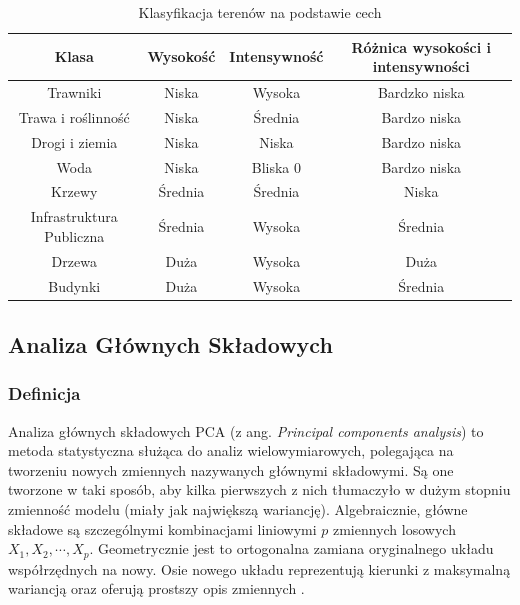 \begin{table}[h!]
    \centering
    \caption{Klasyfikacja terenów na podstawie cech}
    \label{tab:przypisanie_do_klas}
    \begin{tabular}{|c|c|c|c|}
        \hline
        Klasa & Wysokość & Intensywność & Różnica wysokości i intensywności\\
        \hline
        Trawniki & Niska & Wysoka & Bardzko niska\\
        \hline
        Trawa i roślinność & Niska & Średnia & Bardzo niska\\
        \hline
        Drogi i ziemia & Niska & Niska & Bardzo niska\\
        \hline
        Woda & Niska & Bliska 0 & Bardzo niska\\
        \hline
        Krzewy & Średnia & Średnia & Niska\\
        \hline
        Infrastruktura Publiczna & Średnia & Wysoka & Średnia\\
        \hline
        Drzewa & Duża & Wysoka & Duża\\
        \hline
        Budynki & Duża & Wysoka & Średnia\\
        \hline
    \end{tabular}
\end{table}

\subsection{Analiza Głównych Składowych}

\subsubsection{Definicja}
Analiza głównych składowych PCA (z ang. \textit{Principal components analysis}) to metoda statystyczna służąca do analiz wielowymiarowych, polegająca na tworzeniu nowych zmiennych nazywanych głównymi składowymi.
Są one tworzone w taki sposób, aby kilka pierwszych z nich tłumaczyło w dużym stopniu zmienność modelu (miały jak największą wariancję). Algebraicznie, główne składowe są szczególnymi kombinacjami liniowymi $p$
zmiennych losowych $X_{1}, X_{2}, \cdots, X_{p}$. Geometrycznie jest to ortogonalna zamiana oryginalnego układu współrzędnych na nowy. Osie nowego układu reprezentują kierunki z maksymalną wariancją oraz
oferują prostszy opis zmiennych \cite{johnson2002}.

